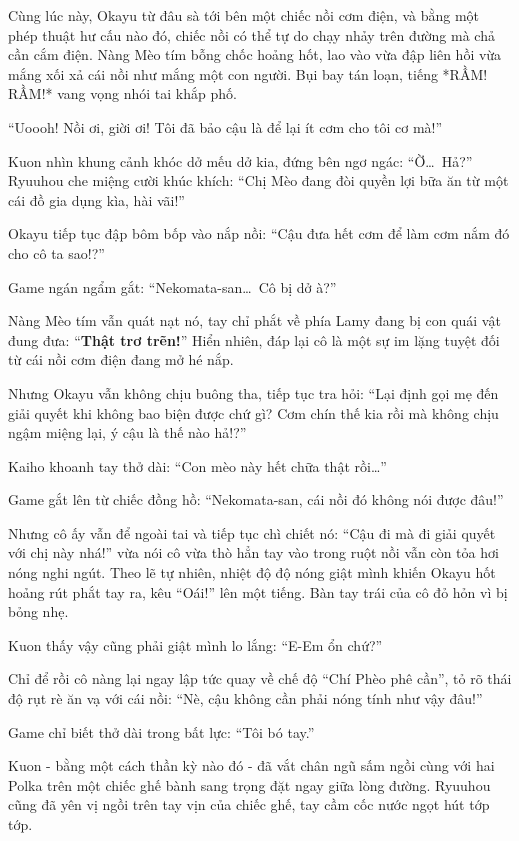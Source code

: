 \documentclass[../main.tex]{subfiles}
\begin{document}
Cùng lúc này, Okayu từ đâu sà tới bên một chiếc nồi cơm điện, và bằng một phép thuật hư cấu nào đó, chiếc nồi có thể tự do chạy nhảy trên đường mà chả cần cắm điện. Nàng Mèo tím bỗng chốc hoảng hốt, lao vào vừa đập liên hồi vừa mắng xối xả cái nồi như mắng một con người. Bụi bay tán loạn, tiếng *RẦM! RẦM!* vang vọng nhói tai khắp phố.

``Uoooh! Nồi ơi, giời ơi! Tôi đã bảo cậu là để lại ít cơm cho tôi cơ mà!''


Kuon nhìn khung cảnh khóc dở mếu dở kia, đứng bên ngơ ngác: ``Ờ\dots\ Hả?'' Ryuuhou che miệng cười khúc khích: ``Chị Mèo đang đòi quyền lợi bữa ăn từ một cái đồ gia dụng kìa, hài vãi!''

Okayu tiếp tục đập bôm bốp vào nắp nồi: ``Cậu đưa hết cơm để làm cơm nắm đó cho cô ta sao!?''

Game ngán ngẩm gắt: ``Nekomata-san\dots\ Cô bị dở à?''

Nàng Mèo tím vẫn quát nạt nó, tay chỉ phắt về phía Lamy đang bị con quái vật đung đưa: ``\textbf{Thật trơ trẽn!}'' Hiển nhiên, đáp lại cô là một sự im lặng tuyệt đối từ cái nồi cơm điện đang mở hé nắp.

Nhưng Okayu vẫn không chịu buông tha, tiếp tục tra hỏi: ``Lại định gọi mẹ đến giải quyết khi không bao biện được chứ gì? Cơm chín thế kia rồi mà không chịu ngậm miệng lại, ý cậu là thế nào hả!?''

Kaiho khoanh tay thở dài: ``Con mèo này hết chữa thật rồi\dots''

Game gắt lên từ chiếc đồng hồ: ``Nekomata-san, cái nồi đó không nói được đâu!''

Nhưng cô ấy vẫn để ngoài tai và tiếp tục chì chiết nó: ``Cậu đi mà đi giải quyết với chị này nhá!'' vừa nói cô vừa thò hẳn tay vào trong ruột nồi vẫn còn tỏa hơi nóng nghi ngút. Theo lẽ tự nhiên, nhiệt độ độ nóng giật mình khiến Okayu hốt hoảng rút phắt tay ra, kêu ``Oái!'' lên một tiếng. Bàn tay trái của cô đỏ hỏn vì bị bỏng nhẹ.


Kuon thấy vậy cũng phải giật mình lo lắng: ``E-Em ổn chứ?''

Chỉ để rồi cô nàng lại ngay lập tức quay về chế độ ``Chí Phèo phê cần'', tỏ rõ thái độ rụt rè ăn vạ với cái nồi: ``Nè, cậu không cần phải nóng tính như vậy đâu!''

Game chỉ biết thở dài trong bất lực: ``Tôi bó tay.''

Kuon - bằng một cách thần kỳ nào đó - đã vắt chân ngũ sấm ngồi cùng với hai Polka trên một chiếc ghế bành sang trọng đặt ngay giữa lòng đường. Ryuuhou cũng đã yên vị ngồi trên tay vịn của chiếc ghế, tay cầm cốc nước ngọt hút tớp tớp.
\end{document}
